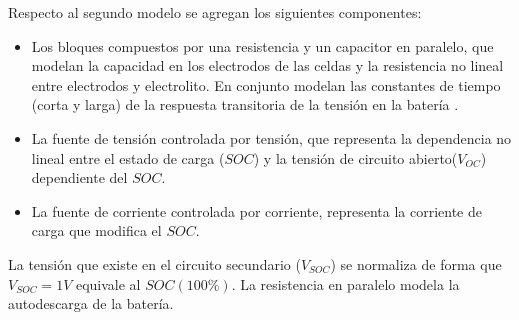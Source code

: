 Respecto al segundo modelo se agregan los siguientes componentes:
\begin{itemize}
    \item Los bloques compuestos por una resistencia y un capacitor en paralelo, que modelan la capacidad en los electrodos de las celdas y
    la resistencia no lineal entre electrodos y electrolito.
    En conjunto modelan las constantes de tiempo (corta y larga) de la respuesta transitoria de la tensión en la batería \cite{modelo_bateria_2}.
    \item La fuente de tensión controlada por tensión, que representa la dependencia no lineal entre el estado de carga ($SOC$)
    y la tensión de circuito abierto($V_{OC}$) dependiente del $SOC$.
    \item La fuente de corriente controlada por corriente, representa la corriente de carga que modifica el $SOC$.
\end{itemize}
La tensión que existe en el circuito secundario ($V_{SOC}$) se normaliza de forma que $V_{SOC}=1V$ equivale al $SOC (100\%)$.
La resistencia en paralelo modela la autodescarga de la batería.
